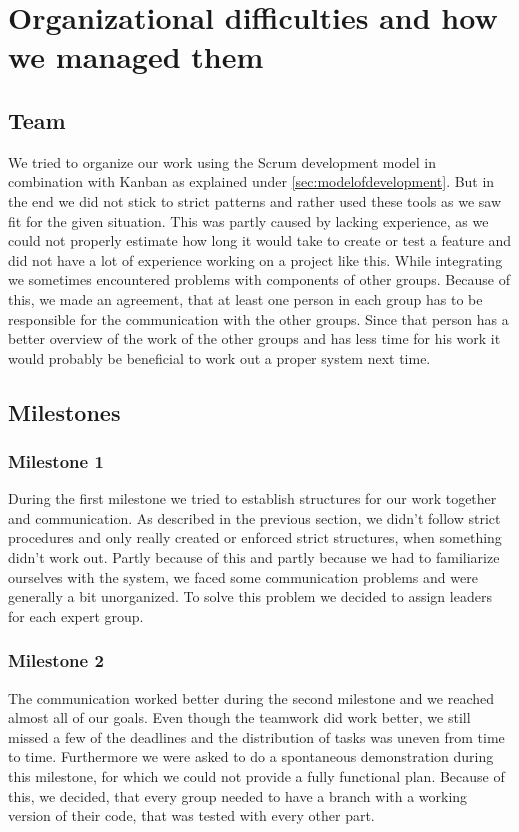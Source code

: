 \documentclass[main.tex]{subfiles}
\begin{document}
	\begingroup

	\renewcommand{\cleardoublepage}{}

	\renewcommand{\clearpage}{}

	\chapter{Organizational difficulties and how we managed them}

		
		\section{Team}
		We tried to organize our work using the Scrum development model in combination with Kanban as explained under \ref{sec:modelofdevelopment}. But in the end we did not stick to strict patterns and rather used these tools as we saw fit for the given situation. This was partly caused by lacking experience, as we could not properly estimate how long it would take to create or test a feature and did not have a lot of experience working on a project like this.
		While integrating we sometimes encountered problems with components of other groups. Because of this, we made an agreement, that at least one person in each group has to be responsible for the communication with the other groups. Since that person has a better overview of the work of the other groups and has less time for his work it would probably be beneficial to work out a proper system next time.
		
		\section{Milestones}
		
		\subsection{Milestone 1}
		During the first milestone we tried to establish structures for our work together and communication. As described in the previous section, we didn't follow strict procedures and only really created or enforced strict structures, when something didn't work out. Partly because of this and partly because we had to familiarize ourselves with the system, we faced some communication problems and were generally a bit unorganized. To solve this problem we decided to assign leaders for each expert group.
		
		\subsection{Milestone 2}
		The communication worked better during the second milestone and we reached almost all of our goals. Even though the teamwork did work better, we still missed a few of the deadlines and the distribution of tasks was uneven from time to time. Furthermore we were asked to do a spontaneous demonstration during this milestone, for which we could not provide a fully functional plan. Because of this, we decided, that every group needed to have a branch with a working version of their code, that was tested with every other part.
		
\end{document}
